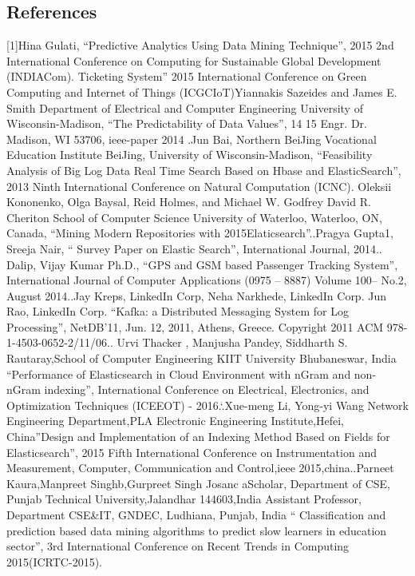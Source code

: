 \documentclass[oneside,a4paper,12pt]{book}
\begin{document}
\begin{enumerate}
\begin{itemize}
\begin{appendices}
\chapter{References}[1]Hina Gulati, “Predictive Analytics Using Data Mining Technique”, 2015 2nd International Conference on Computing for Sustainable Global Development (INDIACom).
Ticketing System” 2015 International Conference on Green Computing and Internet of Things (ICGCIoT)\newline
[2] Yiannakis Sazeides and James E. Smith
Department of Electrical and Computer Engineering University of Wisconsin-Madison, “The Predictability of Data Values”, 14 15 Engr. Dr. Madison, WI 53706, ieee-paper 2014
.\newline
[3] Jun Bai, Northern BeiJing Vocational Education Institute BeiJing, University of Wisconsin-Madison, “Feasibility Analysis of Big Log Data Real Time Search Based on Hbase and ElasticSearch”, 2013 Ninth International Conference on Natural Computation (ICNC)\newline
[4]. Oleksii Kononenko, Olga Baysal, Reid Holmes, and Michael W. Godfrey David R. Cheriton School of Computer Science University of Waterloo, Waterloo, ON, Canada, “Mining Modern Repositories with 2015Elaticsearch”.\newline
[5].Pragya Gupta1, Sreeja Nair, “ Survey Paper on Elastic Search”, International Journal, 2014.\newline
[6]. Dalip, Vijay Kumar Ph.D., “GPS and GSM based Passenger Tracking System”, International Journal of Computer Applications (0975 – 8887) Volume 100– No.2, August 2014.\newline
[7].Jay Kreps, LinkedIn Corp, Neha Narkhede, LinkedIn Corp. Jun Rao, LinkedIn Corp. “Kafka: a Distributed Messaging System for Log Processing”, NetDB'11, Jun. 12, 2011, Athens, Greece. Copyright 2011 ACM 978-1-4503-0652-2/11/06.\newline
[8]. Urvi Thacker , Manjusha Pandey, Siddharth S. Rautaray,School of Computer Engineering KIIT University Bhubaneswar, India “Performance of Elasticsearch in Cloud Environment with nGram and non-nGram indexing”, International Conference on Electrical, Electronics, and Optimization Techniques (ICEEOT) - 2016.`\newline
[9].Xue-meng Li, Yong-yi Wang Network Engineering Department,PLA Electronic Engineering Institute,Hefei, China”Design and Implementation of an Indexing Method Based on Fields for Elasticsearch”, 2015 Fifth International Conference on Instrumentation and Measurement, Computer, Communication and Control,ieee 2015,china.\newline
[10].Parneet Kaura,Manpreet Singhb,Gurpreet Singh Josanc aScholar, Department of CSE, Punjab Technical University,Jalandhar 144603,India Assistant Professor, Department CSE&IT, GNDEC, Ludhiana, Punjab, India “ Classification and prediction based data mining algorithms to predict slow learners in education sector”, 3rd International Conference on Recent Trends in Computing 2015(ICRTC-2015).


\end{appendices}
\end{itemize}
\end{enumerate}
\end{document}
